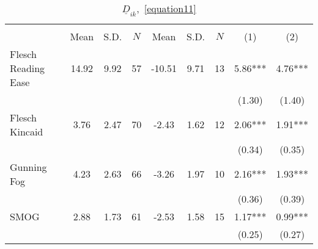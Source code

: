 \begin{table}
    \footnotesize
    \centering
    \begin{threeparttable}
        \caption{\(\underline D_{ik}\),~\autoref{equation11}}
        \label{table10}
        \begin{tabular}{p{3cm}S[table-format=3.3]@{}S[table-format=3.3]@{}S[table-format=3.2]@{}S[table-format=4.3]@{}S[table-format=3.3]@{}S[table-format=3.1]@{}S@{}S@{}}
            \toprule
            &&&\\\cmidrule(lr){2-4}\cmidrule(lr){5-7}\cmidrule(lr){8-9}&{{Mean}}&{{S.D.}}&{{\(N\)}}&{{Mean}}&{{S.D.}}&{{\(N\)}}&{{(1)}}&{{(2)}}\\
            \midrule
            Flesch Reading Ease           &       14.92&        9.92&          57&      -10.51&        9.71&          13&        5.86***&        4.76***\\
                                          &            &            &            &            &            &            &      (1.30)   &      (1.40)   \\
            Flesch Kincaid                &        3.76&        2.47&          70&       -2.43&        1.62&          12&        2.06***&        1.91***\\
                                          &            &            &            &            &            &            &      (0.34)   &      (0.35)   \\
            Gunning Fog                   &        4.23&        2.63&          66&       -3.26&        1.97&          10&        2.16***&        1.93***\\
                                          &            &            &            &            &            &            &      (0.36)   &      (0.39)   \\
            SMOG                          &        2.88&        1.73&          61&       -2.53&        1.58&          15&        1.17***&        0.99***\\
                                          &            &            &            &            &            &            &      (0.25)   &      (0.27)   \\

\end{tabular}
\end{threeparttable}
\end{table}
